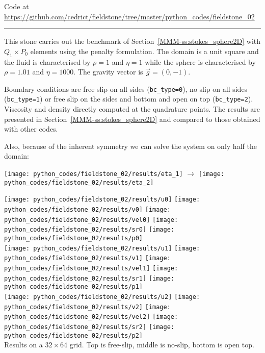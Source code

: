 

\begin{center}
Code at \url{https://github.com/cedrict/fieldstone/tree/master/python_codes/fieldstone_02}
\end{center}

\par\noindent\rule{\textwidth}{0.4pt}

This stone carries out the benchmark of Section~\ref{MMM-ss:stokes_sphere2D}
with $Q_1\times P_0$ elements using the penalty formulation.
The domain is a unit square and the fluid is characterised 
by $\rho=1$ and $\eta=1$ 
while the sphere is characterised 
by $\rho=1.01$ and $\eta=1000$.
The gravity vector is $\vec{g}=(0,-1)$. 

Boundary conditions are free slip on all sides ({\tt bc\_type=0}), 
no slip on all sides ({\tt bc\_type=1}) or free slip on the sides and bottom and open 
on top ({\tt bc\_type=2}).
Viscosity and density directly computed at the quadrature points.
The results are presented in Section~\ref{MMM-ss:stokes_sphere2D} and compared to 
those obtained with other codes.

Also, because of the inherent symmetry we can solve the system 
on only half the domain:
\begin{center}
\texttt{[image: python\_codes/fieldstone\_02/results/eta\_1]}
$\rightarrow$
\texttt{[image: python\_codes/fieldstone\_02/results/eta\_2]}
\end{center}


\begin{center}
\texttt{[image: python\_codes/fieldstone\_02/results/u0]}
\texttt{[image: python\_codes/fieldstone\_02/results/v0]}
\texttt{[image: python\_codes/fieldstone\_02/results/vel0]}
\texttt{[image: python\_codes/fieldstone\_02/results/sr0]}
\texttt{[image: python\_codes/fieldstone\_02/results/p0]}\\
\texttt{[image: python\_codes/fieldstone\_02/results/u1]}
\texttt{[image: python\_codes/fieldstone\_02/results/v1]}
\texttt{[image: python\_codes/fieldstone\_02/results/vel1]}
\texttt{[image: python\_codes/fieldstone\_02/results/sr1]}
\texttt{[image: python\_codes/fieldstone\_02/results/p1]}\\
\texttt{[image: python\_codes/fieldstone\_02/results/u2]}
\texttt{[image: python\_codes/fieldstone\_02/results/v2]}
\texttt{[image: python\_codes/fieldstone\_02/results/vel2]}
\texttt{[image: python\_codes/fieldstone\_02/results/sr2]}
\texttt{[image: python\_codes/fieldstone\_02/results/p2]}\\
{\captionfont Results on a $32\times 64$ grid. Top is free-slip, 
middle is no-slip, bottom is open top.}
\end{center}


